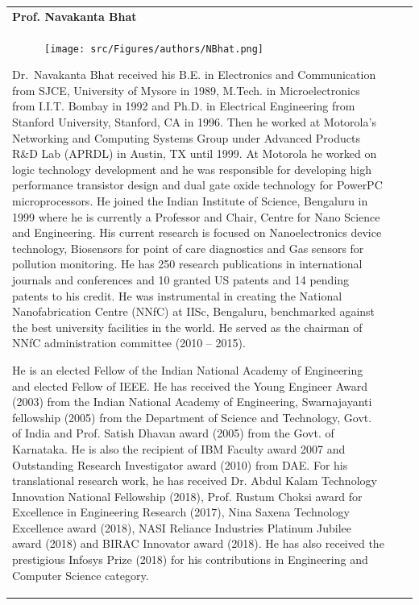 \newpage
{\tabcolsep=10pt
\renewcommand{\arraystretch}{1.7}
\begin{longtable}{V{2.5}p{.95\textwidth}V{2.5}}

\centerline{\large\bf Prof. Navakanta Bhat}\\[-.5cm]

\begin{figure}
\vspace{-10pt}

\texttt{[image: src/Figures/authors/NBhat.png]}

\vspace{-5pt}
\end{figure}
Dr.~Navakanta Bhat received his B.E. in Electronics and Communication from SJCE, University of Mysore in 1989, M.Tech. in Microelectronics from I.I.T. Bombay in 1992 and Ph.D. in Electrical Engineering from Stanford University, Stanford, CA in 1996. Then he worked at Motorola’s Networking and Computing Systems Group under Advanced Products R\&D Lab (APRDL)  in Austin, TX until 1999. At Motorola he worked on logic technology development and he was responsible for developing high performance transistor design and dual gate oxide technology for PowerPC microprocessors. He joined the Indian Institute of Science, Bengaluru in 1999 where he is currently a Professor and Chair, Centre for Nano Science and Engineering. His current research is focused on Nanoelectronics device technology, Biosensors for point of care diagnostics and Gas sensors for pollution monitoring. He has 250 research publications in international journals and conferences and 10 granted US patents and 14 pending patents to his credit. He was instrumental in creating the National Nanofabrication Centre (NNfC) at IISc, Bengaluru, benchmarked against the best university facilities in the world. He served as the chairman of NNfC administration committee (2010 – 2015).

\bigskip

He is an elected Fellow of the Indian National Academy of Engineering and elected Fellow of IEEE. He has received the Young Engineer Award (2003) from the Indian National Academy of Engineering, Swarnajayanti fellowship (2005) from the Department of Science and Technology, Govt. of India and Prof. Satish Dhavan award (2005) from the Govt. of Karnataka. He is also the recipient of IBM Faculty award 2007 and Outstanding Research Investigator award (2010) from DAE. For his translational research work, he has received Dr. Abdul Kalam Technology Innovation National Fellowship (2018), Prof. Rustum Choksi award for Excellence in Engineering Research (2017), Nina Saxena Technology Excellence award (2018), NASI Reliance Industries Platinum Jubilee award (2018) and BIRAC Innovator award (2018). He has also received the prestigious Infosys Prize (2018) for his contributions in Engineering and Computer Science category. 


\end{longtable}}
